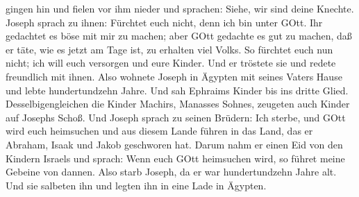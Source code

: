 gingen hin und fielen vor ihm nieder und sprachen: Siehe, wir sind deine
Knechte.  Joseph sprach zu ihnen: Fürchtet euch nicht, denn
ich bin unter GOtt.  Ihr gedachtet es böse mit mir zu
machen; aber GOtt gedachte es gut zu machen, daß er täte, wie es jetzt
am Tage ist, zu erhalten viel Volks.  So fürchtet euch nun
nicht; ich will euch versorgen und eure Kinder. Und er tröstete sie und
redete freundlich mit ihnen.  Also wohnete Joseph in
Ägypten mit seines Vaters Hause und lebte hundertundzehn Jahre.
 Und sah Ephraims Kinder bis ins dritte Glied.
Desselbigengleichen die Kinder Machirs, Manasses Sohnes, zeugeten auch
Kinder auf Josephs Schoß.  Und Joseph sprach zu seinen
Brüdern: Ich sterbe, und GOtt wird euch heimsuchen und aus diesem Lande
führen in das Land, das er Abraham, Isaak und Jakob geschworen hat.
 Darum nahm er einen Eid von den Kindern Israels und
sprach: Wenn euch GOtt heimsuchen wird, so führet meine Gebeine von
dannen.  Also starb Joseph, da er war hundertundzehn Jahre
alt. Und sie salbeten ihn und legten ihn in eine Lade in Ägypten.
